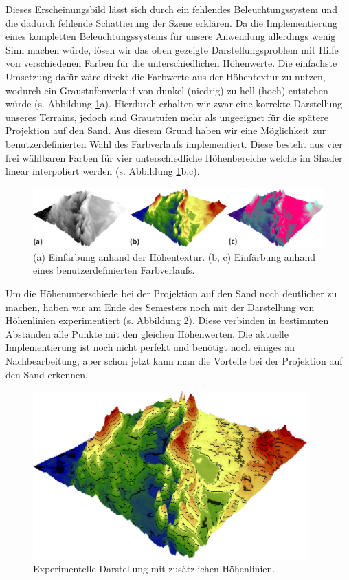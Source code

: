 \begin{Spacing}{\mylinespace}
Dieses Erscheinungsbild lässt sich durch ein fehlendes Beleuchtungssystem und die dadurch fehlende Schattierung der Szene erklären. Da die Implementierung eines kompletten Beleuchtungssystems für unsere Anwendung allerdings wenig Sinn machen würde, lösen wir das oben gezeigte Darstellungsproblem mit Hilfe von verschiedenen Farben für die unterschiedlichen Höhenwerte. Die einfachste Umsetzung dafür wäre direkt die Farbwerte aus der Höhentextur zu nutzen, wodurch ein Graustufenverlauf von dunkel (niedrig) zu hell (hoch) entstehen würde (s. Abbildung \ref{fig:differentColors}a). Hierdurch erhalten wir zwar eine korrekte Darstellung unseres Terrains, jedoch sind Graustufen mehr als ungeeignet für die spätere Projektion auf den Sand. Aus diesem Grund haben wir eine Möglichkeit zur benutzerdefinierten Wahl des Farbverlaufs implementiert. Diese besteht aus vier frei wählbaren Farben für vier unterschiedliche Höhenbereiche welche im Shader linear interpoliert werden (s. Abbildung \ref{fig:differentColors}b,c).    

\begin{figure}[h!]
	\centering
	\vspace*{30px}
	\includegraphics[width=\textwidth]{graphics/differentColors.png}
	\caption{(a) Einfärbung anhand der Höhentextur. (b, c) Einfärbung anhand eines benutzerdefinierten Farbverlaufs.}
	\label{fig:differentColors}
\end{figure}

Um die Höhenunterschiede bei der Projektion auf den Sand noch deutlicher zu machen, haben wir am Ende des Semesters noch mit der Darstellung von Höhenlinien experimentiert (s. Abbildung \ref{fig:contourLines}). Diese verbinden in bestimmten Abständen alle Punkte mit den gleichen Höhenwerten. Die aktuelle Implementierung ist noch nicht perfekt und benötigt noch einiges an Nachbearbeitung, aber schon jetzt kann man die Vorteile bei der Projektion auf den Sand erkennen. 

\begin{figure}[h!]
	\centering
	\vspace*{50px}
	\includegraphics[width=400px]{graphics/contourLines.png}
	\caption{Experimentelle Darstellung mit zusätzlichen Höhenlinien.}
	\label{fig:contourLines}
\end{figure}


\end{Spacing}
\newpage
\clearpage
